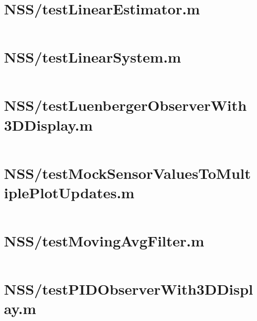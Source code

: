 \pagebreak
\section*{NSS/testLinearEstimator.m}\label{code:NSS/testLinearEstimator.m}
\inputminted[linenos,fontsize=\scriptsize]{matlab}{/home/dcouture/git/mathyourlife/TSatPy/beta_versions/matlab_object_oriented/testLinearEstimator.m}

\pagebreak
\section*{NSS/testLinearSystem.m}\label{code:NSS/testLinearSystem.m}
\inputminted[linenos,fontsize=\scriptsize]{matlab}{/home/dcouture/git/mathyourlife/TSatPy/beta_versions/matlab_object_oriented/testLinearSystem.m}

\pagebreak
\section*{NSS/testLuenbergerObserverWith3DDisplay.m}\label{code:NSS/testLuenbergerObserverWith3DDisplay.m}
\inputminted[linenos,fontsize=\scriptsize]{matlab}{/home/dcouture/git/mathyourlife/TSatPy/beta_versions/matlab_object_oriented/testLuenbergerObserverWith3DDisplay.m}

\pagebreak
\section*{NSS/testMockSensorValuesToMultiplePlotUpdates.m}\label{code:NSS/testMockSensorValuesToMultiplePlotUpdates.m}
\inputminted[linenos,fontsize=\scriptsize]{matlab}{/home/dcouture/git/mathyourlife/TSatPy/beta_versions/matlab_object_oriented/testMockSensorValuesToMultiplePlotUpdates.m}

\pagebreak
\section*{NSS/testMovingAvgFilter.m}\label{code:NSS/testMovingAvgFilter.m}
\inputminted[linenos,fontsize=\scriptsize]{matlab}{/home/dcouture/git/mathyourlife/TSatPy/beta_versions/matlab_object_oriented/testMovingAvgFilter.m}

\pagebreak
\section*{NSS/testPIDObserverWith3DDisplay.m}\label{code:NSS/testPIDObserverWith3DDisplay.m}
\inputminted[linenos,fontsize=\scriptsize]{matlab}{/home/dcouture/git/mathyourlife/TSatPy/beta_versions/matlab_object_oriented/testPIDObserverWith3DDisplay.m}


